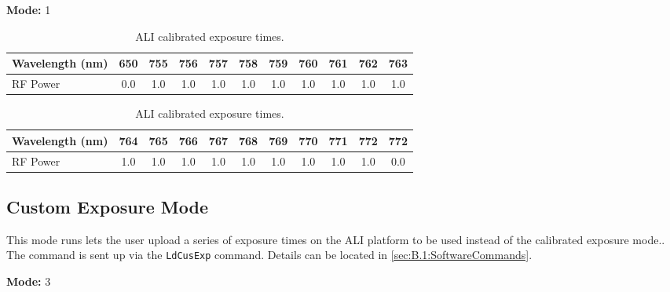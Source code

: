 \textbf{Mode:} 1

\begin{table}
    \begin{center}
    \begin{tabular}{|l|c|c|c|c|c|c|c|c|c|c|}
    \hline
    Wavelength (nm) & 650 & 755 & 756 & 757 & 758 & 759 & 760 & 761 & 762 & 763 \\
    \hline
    RF Power & 0.0 & 1.0 & 1.0 & 1.0 & 1.0 & 1.0 & 1.0 & 1.0 & 1.0 & 1.0 \\
    \hline
    \end{tabular}
    \vspace{5mm}
    \begin{tabular}{|l|c|c|c|c|c|c|c|c|c|c|}
    \hline
    Wavelength (nm) & 764 & 765 & 766 & 767 & 768 & 769 & 770 & 771 & 772 & 772 \\
    \hline
    RF Power & 1.0 & 1.0 & 1.0 & 1.0 & 1.0 & 1.0 & 1.0 & 1.0 & 1.0 & 0.0 \\
    \hline
    \end{tabular}
    \end{center}
    \caption[ALI Calibrated Exposure Times]{ALI calibrated exposure times.}
    \label{tab:B.2:O2ScienceModes}
\end{table}

\subsection{Custom Exposure Mode}

This mode runs lets the user upload a series of exposure times on the ALI platform to be used instead of the calibrated exposure mode.. The command is sent up via the \texttt{LdCusExp} command. Details can be located in \autoref{sec:B.1:SoftwareCommands}.

\textbf{Mode:} 3